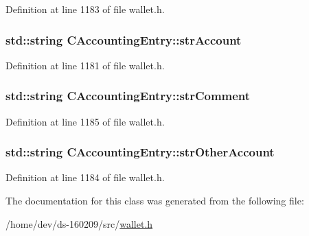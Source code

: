 Definition at line 1183 of file wallet.\+h.

\hypertarget{class_c_accounting_entry_a01434c1b0edad576bc1584c9b667ce1d}{}
\subsubsection[{str\+Account}]{\setlength{\rightskip}{0pt plus 5cm}std\+::string C\+Accounting\+Entry\+::str\+Account}\label{class_c_accounting_entry_a01434c1b0edad576bc1584c9b667ce1d}


Definition at line 1181 of file wallet.\+h.

\hypertarget{class_c_accounting_entry_a80c42068f19b13e3201926d340fd10e9}{}
\subsubsection[{str\+Comment}]{\setlength{\rightskip}{0pt plus 5cm}std\+::string C\+Accounting\+Entry\+::str\+Comment}\label{class_c_accounting_entry_a80c42068f19b13e3201926d340fd10e9}


Definition at line 1185 of file wallet.\+h.

\hypertarget{class_c_accounting_entry_a6856c75221e9df5b6a99dda88f45d911}{}
\subsubsection[{str\+Other\+Account}]{\setlength{\rightskip}{0pt plus 5cm}std\+::string C\+Accounting\+Entry\+::str\+Other\+Account}\label{class_c_accounting_entry_a6856c75221e9df5b6a99dda88f45d911}


Definition at line 1184 of file wallet.\+h.



The documentation for this class was generated from the following file\+:\begin{DoxyCompactItemize}
\item 
/home/dev/ds-\/160209/src/\hyperlink{wallet_8h}{wallet.\+h}\end{DoxyCompactItemize}
